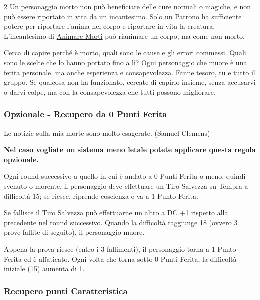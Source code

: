 \begin{multicols}{2}
Un personaggio morto non può beneficiare delle cure normali o magiche, e non può essere riportato in vita da un incantesimo. Solo un Patrono ha sufficiente potere per riportare l'anima nel corpo e riportare in vita la creatura. L'incantesimo di \hyperlink{Animare Morti}{Animare Morti} può rianimare un corpo, ma come non morto.

\begin{giocatore}
Cerca di capire perché è morto, quali sono le cause e gli errori commessi. Quali sono le scelte che lo hanno portato fino a lì? Ogni personaggio che muore è una ferita personale, ma anche esperienza e consapevolezza. Fanne tesoro, tu e tutto il gruppo. Se qualcosa non ha funzionato, cercate di capirlo insieme, senza accusarvi o darvi colpe, ma con la consapevolezza che tutti possono migliorare.
\end{giocatore}

\subsubsection{Opzionale - Recupero da 0 Punti Ferita}  \label{recuperozeropf}

\begin{enfasi}{
Le notizie sulla mia morte sono molto esagerate. (Samuel Clemens)
}\end{enfasi}

\textbf{Nel caso vogliate un sistema meno letale potete applicare questa regola opzionale.}

Ogni round successivo a quello in cui è andato a 0 Punti Ferita o meno, quindi svenuto o morente, il personaggio deve effettuare un Tiro Salvezza su Tempra a difficoltà 15; se riesce, riprende coscienza e va a 1 Punto Ferita.

Se fallisce il Tiro Salvezza può effettuarne un altro a DC +1 rispetto alla precedente nel round successivo. Quando la difficoltà raggiunge 18 (ovvero 3 prove fallite di seguito), il personaggio muore.

Appena la prova riesce (entro i 3 fallimenti), il personaggio torna a 1 Punto Ferita ed è affaticato. Ogni volta che torna sotto 0 Punti Ferita, la difficoltà iniziale (15) aumenta di 1.

\subsubsection{Recupero punti Caratteristica}\label{recuperopunticcaratteristica}


\end{multicols}
